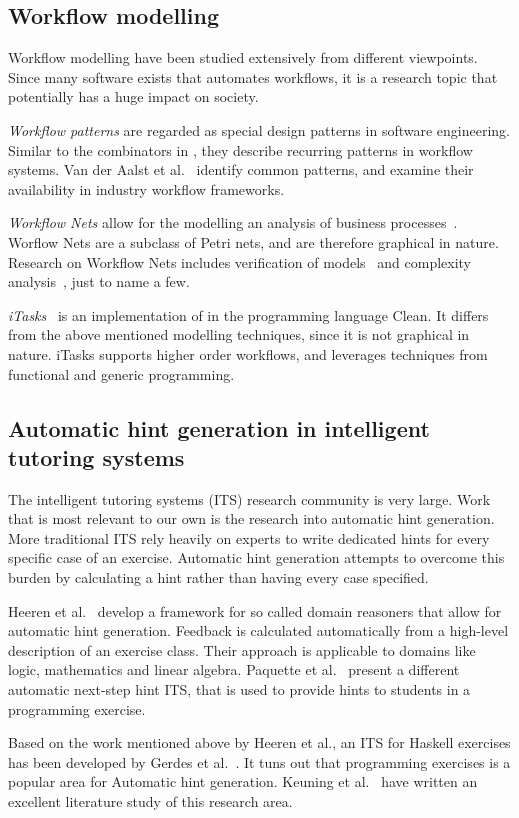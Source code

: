 \subsection{Workflow modelling}

Workflow modelling have been studied extensively from different viewpoints.
Since many software exists that automates workflows, it is a research topic that potentially has a huge impact on society.

\emph{Workflow patterns} are regarded as special design patterns in software engineering.
Similar to the combinators in \TOP, they describe recurring patterns in workflow systems.
Van der Aalst et al.~\cite{journals/dpd/AalstHKB03} identify common patterns, and examine their availability in industry workflow frameworks.

\emph{Workflow Nets} allow for the modelling an analysis of business processes~\cite{DBLP:journals/jcsc/Aalst98}.
Worflow Nets are a subclass of Petri nets, and are therefore graphical in nature.
Research on Workflow Nets includes verification of models~\cite{DBLP:conf/apn/Aalst97} and complexity analysis~\cite{DBLP:journals/infsof/LassenA09}, just to name a few.


\emph{iTasks}~\cite{DBLP:conf/ppdp/PlasmeijerLMAK12} is an implementation of \TOP in the programming language Clean.
It differs from the above mentioned modelling techniques, since it is not graphical in nature.
iTasks supports higher order workflows, and leverages techniques from functional and generic programming.


\subsection{Automatic hint generation in intelligent tutoring systems}

The intelligent tutoring systems (ITS) research community is very large.
Work that is most relevant to our own is the research into automatic hint generation.
More traditional ITS rely heavily on experts to write dedicated hints for every specific case of an exercise.
Automatic hint generation attempts to overcome this burden by calculating a hint rather than having every case specified.

Heeren et al.~\cite{DBLP:journals/scp/HeerenJ14} develop a framework for so called domain reasoners that allow for automatic hint generation.
Feedback is calculated automatically from a high-level description of an exercise class.
Their approach is applicable to domains like logic, mathematics and linear algebra.
Paquette et al.~\cite{DBLP:conf/its/PaquetteLBM12} present a different automatic next-step hint ITS, that is used to provide hints to students in a programming exercise.

Based on the work mentioned above by Heeren et al., an ITS for Haskell exercises has been developed by Gerdes et al.~\cite{DBLP:journals/aiedu/GerdesHJB17}.
It tuns out that programming exercises is a popular area for Automatic hint generation.
Keuning et al.~\cite{DBLP:journals/jeric/KeuningJH19} have written an excellent literature study of this research area.
